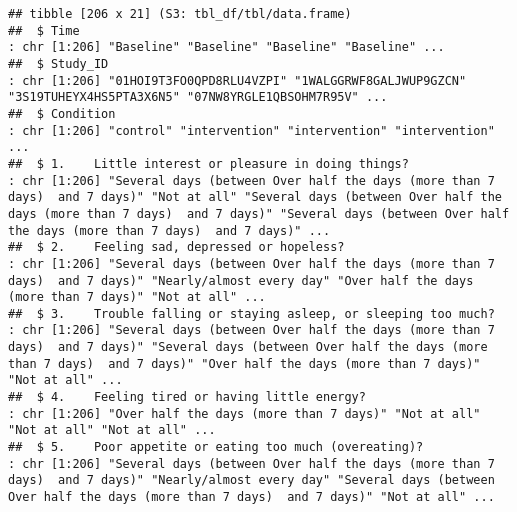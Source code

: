 \documentclass[
]{article}
\begin{document}
\begin{verbatim}
## tibble [206 x 21] (S3: tbl_df/tbl/data.frame)
##  $ Time                                                                                                                                                                          : chr [1:206] "Baseline" "Baseline" "Baseline" "Baseline" ...
##  $ Study_ID                                                                                                                                                                      : chr [1:206] "01HOI9T3FO0QPD8RLU4VZPI" "1WALGGRWF8GALJWUP9GZCN" "3S19TUHEYX4HS5PTA3X6N5" "07NW8YRGLE1QBSOHM7R95V" ...
##  $ Condition                                                                                                                                                                     : chr [1:206] "control" "intervention" "intervention" "intervention" ...
##  $ 1.    Little interest or pleasure in doing things?                                                                                                                              : chr [1:206] "Several days (between Over half the days (more than 7 days)  and 7 days)" "Not at all" "Several days (between Over half the days (more than 7 days)  and 7 days)" "Several days (between Over half the days (more than 7 days)  and 7 days)" ...
##  $ 2.    Feeling sad, depressed or hopeless?                                                                                                                                       : chr [1:206] "Several days (between Over half the days (more than 7 days)  and 7 days)" "Nearly/almost every day" "Over half the days (more than 7 days)" "Not at all" ...
##  $ 3.    Trouble falling or staying asleep, or sleeping too much?                                                                                                                  : chr [1:206] "Several days (between Over half the days (more than 7 days)  and 7 days)" "Several days (between Over half the days (more than 7 days)  and 7 days)" "Over half the days (more than 7 days)" "Not at all" ...
##  $ 4.    Feeling tired or having little energy?                                                                                                                                    : chr [1:206] "Over half the days (more than 7 days)" "Not at all" "Not at all" "Not at all" ...
##  $ 5.    Poor appetite or eating too much (overeating)?                                                                                                                            : chr [1:206] "Several days (between Over half the days (more than 7 days)  and 7 days)" "Nearly/almost every day" "Several days (between Over half the days (more than 7 days)  and 7 days)" "Not at all" ...

\end{verbatim}
\end{document}
